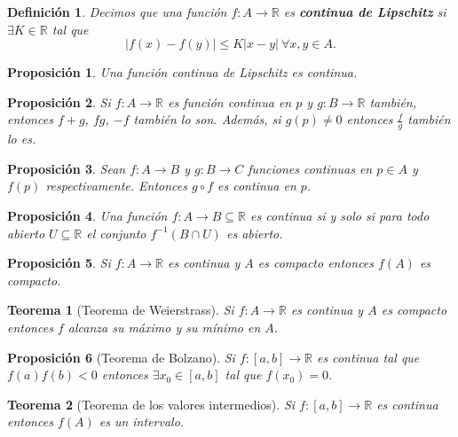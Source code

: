 \documentclass{article}
\newtheorem{theorem}{Teorema}
\newtheorem{prop}{Proposición}
\newtheorem{define}{Definición}
\newcommand{\reales}{\mathbb{R}}
\begin{document}
\begin{define}
	Decimos que una función $f: A \rightarrow \reales$ es \textbf{continua de Lipschitz} si $\exists K \in \reales$ tal que
	\begin{equation*}
		|f(x) - f(y)| \leq K|x - y|\ \forall x,y \in A.
	\end{equation*}
\end{define}

\begin{prop}
	Una función continua de Lipschitz es continua.
\end{prop}

\begin{prop}
	Si $f: A \rightarrow \reales$ es función continua en $p$ y $g: B \rightarrow \reales$ también, entonces $f + g$, $fg$, $-f$ también lo son. Además, si $g(p) \neq 0$ entonces $\frac{f}{g}$ también lo es.
\end{prop}

\begin{prop}
	Sean $f: A \rightarrow B$ y $g: B \rightarrow C$ funciones continuas en $p\in A$ y $f(p)$ respectivamente. Entonces $g \circ f$ es continua en $p$.
\end{prop}

\begin{prop}
	Una función $f: A \rightarrow B \subseteq \reales$ es continua si y solo si para todo abierto $U \subseteq \reales$ el conjunto $f^{-1}(B \cap U)$ es abierto.
\end{prop}

\begin{prop}
	Si $f: A \rightarrow \reales$ es continua y $A$ es compacto entonces $f(A)$ es compacto. 
\end{prop}

\begin{theorem}[Teorema de Weierstrass]
	Si $f: A \rightarrow \reales$ es continua y $A$ es compacto entonces $f$ alcanza su máximo y su mínimo en $A$.
\end{theorem}

\begin{prop}[Teorema de Bolzano]
	Si $f: [a, b] \rightarrow \reales$ es continua tal que $f(a)f(b) < 0$ entonces $\exists x_0 \in [a, b]$ tal que $f(x_0) = 0$.
\end{prop}

\begin{theorem}[Teorema de los valores intermedios]
	Si $f: [a, b] \rightarrow \reales$ es continua entonces $f(A)$ es un intervalo.
\end{theorem}
\end{document}
